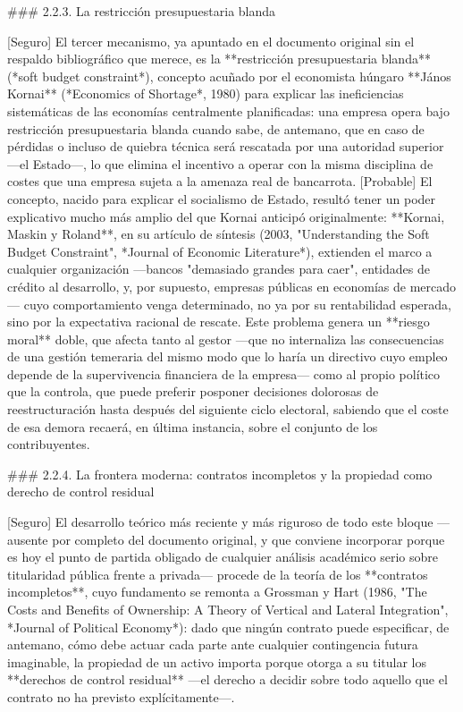\documentclass[10pt,a4paper]{article}
\begin{document}
### 2.2.3. La restricción presupuestaria blanda

[Seguro] El tercer mecanismo, ya apuntado en el documento original sin el respaldo bibliográfico que merece, es la **restricción presupuestaria blanda** (*soft budget constraint*), concepto acuñado por el economista húngaro **János Kornai** (*Economics of Shortage*, 1980) para explicar las ineficiencias sistemáticas de las economías centralmente planificadas: una empresa opera bajo restricción presupuestaria blanda cuando sabe, de antemano, que en caso de pérdidas o incluso de quiebra técnica será rescatada por una autoridad superior —el Estado—, lo que elimina el incentivo a operar con la misma disciplina de costes que una empresa sujeta a la amenaza real de bancarrota. [Probable] El concepto, nacido para explicar el socialismo de Estado, resultó tener un poder explicativo mucho más amplio del que Kornai anticipó originalmente: **Kornai, Maskin y Roland**, en su artículo de síntesis (2003, "Understanding the Soft Budget Constraint", *Journal of Economic Literature*), extienden el marco a cualquier organización —bancos "demasiado grandes para caer", entidades de crédito al desarrollo, y, por supuesto, empresas públicas en economías de mercado— cuyo comportamiento venga determinado, no ya por su rentabilidad esperada, sino por la expectativa racional de rescate. Este problema genera un **riesgo moral** doble, que afecta tanto al gestor —que no internaliza las consecuencias de una gestión temeraria del mismo modo que lo haría un directivo cuyo empleo depende de la supervivencia financiera de la empresa— como al propio político que la controla, que puede preferir posponer decisiones dolorosas de reestructuración hasta después del siguiente ciclo electoral, sabiendo que el coste de esa demora recaerá, en última instancia, sobre el conjunto de los contribuyentes.

### 2.2.4. La frontera moderna: contratos incompletos y la propiedad como derecho de control residual

[Seguro] El desarrollo teórico más reciente y más riguroso de todo este bloque —ausente por completo del documento original, y que conviene incorporar porque es hoy el punto de partida obligado de cualquier análisis académico serio sobre titularidad pública frente a privada— procede de la teoría de los **contratos incompletos**, cuyo fundamento se remonta a Grossman y Hart (1986, "The Costs and Benefits of Ownership: A Theory of Vertical and Lateral Integration", *Journal of Political Economy*): dado que ningún contrato puede especificar, de antemano, cómo debe actuar cada parte ante cualquier contingencia futura imaginable, la propiedad de un activo importa porque otorga a su titular los **derechos de control residual** —el derecho a decidir sobre todo aquello que el contrato no ha previsto explícitamente—.
\end{document}
